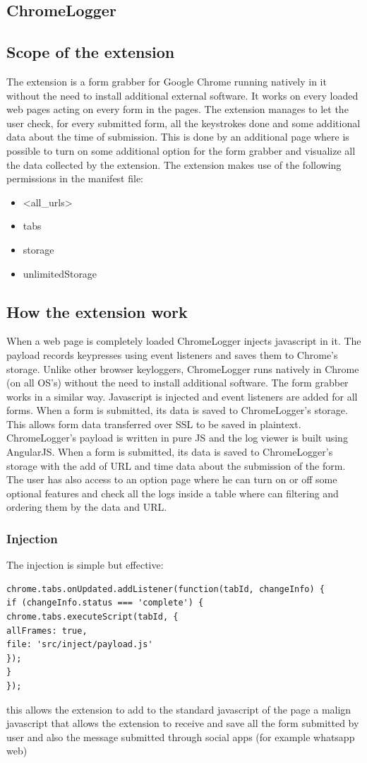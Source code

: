 \documentclass[12pt]{article}
\begin{document}
\begin{multicols}{2}
\section*{ChromeLogger}
\subsection*{Scope of the extension}
The extension is a form grabber for Google Chrome running natively in it without the need to install additional external software. It works on every loaded web pages acting on every form in the pages.
The extension manages to let the user check, for every submitted form, all the keystrokes done and some additional data about the time of submission. This is done by an additional page where is possible to turn on some additional option for the form grabber and visualize all the data collected by the extension.
The extension makes use of the following permissions in the manifest file:
\begin{itemize}
	\item  <all\_urls>
	\item  tabs
	\item  storage
	\item  unlimitedStorage
\end{itemize}
\subsection*{How the extension work}
When a web page is completely loaded ChromeLogger injects javascript in it. The payload records keypresses using event listeners and saves them to Chrome's storage. Unlike other browser keyloggers, ChromeLogger runs natively in Chrome (on all OS's) without the need to install additional software.
The form grabber works in a similar way. Javascript is injected and event listeners are added for all forms. When a form is submitted, its data is saved to ChromeLogger's storage. This allows form data transferred over SSL to be saved in plaintext.
ChromeLogger's payload is written in pure JS and the log viewer is built using AngularJS. When a form is submitted, its data is saved to ChromeLogger's storage with the add of URL and time data about the submission of the form.
The user has also access to an option page where he can turn on or off some optional features and check all the logs inside a table where can filtering and ordering them by the data and URL.
\subsubsection*{Injection}
The injection is simple but effective:
\begin{lstlisting}
chrome.tabs.onUpdated.addListener(function(tabId, changeInfo) {
if (changeInfo.status === 'complete') {
chrome.tabs.executeScript(tabId, {
allFrames: true, 
file: 'src/inject/payload.js'
});
}
});
\end{lstlisting}
this allows the extension to add to the standard javascript of the page a malign javascript that allows the extension to receive and save all the form submitted by user and also the message submitted through social apps (for example whatsapp web)

\end{multicols}
\end{document}
